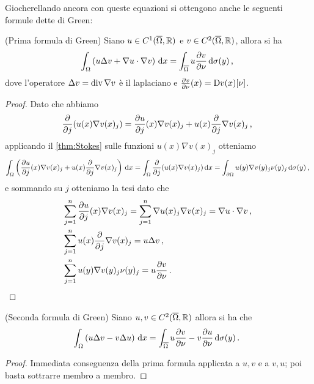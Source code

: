 Giocherellando ancora con queste equazioni si ottengono anche le seguenti formule dette di Green:

\begin{corollary}(Prima formula di Green)
	Siano $u\in C^1(\overline\Omega, \mathbb R)$ e $v\in C^2(\overline\Omega, \mathbb R)$, allora si ha
	\[
		\int_{\Omega} \left( u \Delta v+ \nabla u\cdot\nabla v \right) \,\mathrm d x=
		\int_{\overline\Omega} u \frac{\partial v}{\partial \nu} \,\mathrm d \sigma(y) \, \text{, }
	\]
	dove l'operatore $\Delta v = \operatorname{div} \nabla v$ è il laplaciano e $\frac{\partial v}{\partial \nu}(x)=\mathrm D v(x)[\nu]$.
\end{corollary}
\begin{proof}
	Dato che abbiamo 
	\begin{equation*}
		\frac{\partial }{\partial j} (u(x)\nabla v(x)_j ) = \frac{\partial u}{\partial j}(x) \nabla v(x)_j + u(x)\frac{\partial}{\partial j}\nabla v(x)_j\, \text{, }
	\end{equation*}
	applicando il \cref{thm:Stokes} sulle funzioni $u(x)\nabla v(x)_j$ otteniamo
	\[
		\int_{\Omega} \left(\frac{\partial u}{\partial j}(x) \nabla v(x)_j + u(x)\frac{\partial}{\partial j}\nabla v(x)_j \right)\,\mathrm d x = 
		\int_{\Omega} \frac{\partial }{\partial j} (u(x)\nabla v(x)_j) \,\mathrm d x =
		\int_{\partial \Omega} u(y)\nabla v(y)_j\nu(y)_j \,\mathrm d \sigma(y)\, \text{, }
	\]
	e sommando su $j$ otteniamo la tesi dato che
	\begin{align*}
		&\sum_{j=1}^n \frac{\partial u}{\partial j}(x) \nabla v(x)_j = \sum_{j=1}^n \nabla u(x)_j \nabla v(x)_j = \nabla u\cdot\nabla v \, \text{, }\\
		&\sum_{j=1}^n u(x)\frac{\partial}{\partial j}\nabla v(x)_j = u \Delta v\, \text{, }\\
		&\sum_{j=1}^n u(y)\nabla v(y)_j\nu(y)_j = u \frac{\partial v}{\partial \nu}\, \text{. }
	\end{align*}
\end{proof}

\begin{corollary}(Seconda formula di Green)
	Siano $u,v\in C^2(\overline\Omega, \mathbb R)$ allora si ha che
	\[
		\int_{\Omega}\left(u\Delta v-v\Delta u\right) \,\mathrm d x=
		\int_{\overline\Omega}u\frac{\partial v}{\partial\nu}-v\frac{\partial u}{\partial\nu} \,\mathrm d \sigma(y)\, \text{. }
	\]
\end{corollary}

\begin{proof}
	Immediata conseguenza della prima formula applicata a $u,v$ e a $v,u$; poi basta sottrarre membro a membro.
\end{proof}


